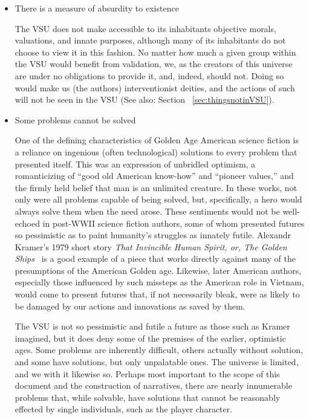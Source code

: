 \begin{itemize}

\item There is a measure of absurdity to existence

The VSU does not make accessible to its inhabitants objective morals,
valuations, and innate purposes, although many of its inhabitants do
not choose to view it in this fashion. No matter how much a given
group within the VSU would benefit from validation, we, as the
creators of this universe are under no obligations to provide it, and,
indeed, should not. Doing so would make us (the authors)
interventionist deities, and the actions of such will not be seen in
the VSU (See also: Section ~\ref{sec:thingsnotinVSU}).

\item Some problems cannot be solved

One of the defining characteristics of Golden Age American science
fiction is a reliance on ingenious (often technological) solutions to
every problem that presented itself. This was an expression of
unbridled optimism, a romanticizing of ``good old American
know-how'' and ``pioneer values,'' and the firmly held belief that man
is an unlimited creature. In these works, not only were all problems
capable of being solved, but, specifically, a hero would always solve
them when the need arose. These sentiments would not be well-echoed in
post-WWII science fiction authors, some of whom presented futures so
pessimistic as to paint humanity's struggles as innately
futile. Alexandr Kramer's 1979 short story
\emph{That Invincible Human Spirit, or, The Golden
Ships}~\cite{GoldenShips} is a good example of a piece that works
directly against many of the presumptions of the American Golden
age. Likewise, later American authors, especially those influenced by
such missteps as the American role in Vietnam, would come to present
futures that, if not necessarily bleak, were as likely to be damaged
by our actions and innovations as saved by them.

The VSU is not so pessimistic and futile a future as those such as
Kramer imagined, but it does deny some of the premises of the earlier,
optimistic ages. Some problems are inherently difficult, others
actually without solution, and some have solutions, but only
unpalatable ones. The universe is limited, and we with it likewise
so. Perhaps most important to the scope of this document and the
construction of narratives, there are nearly innumerable problems
that, while solvable, have solutions that cannot be reasonably
effected by single individuals, such as the player character.


\end{itemize}

